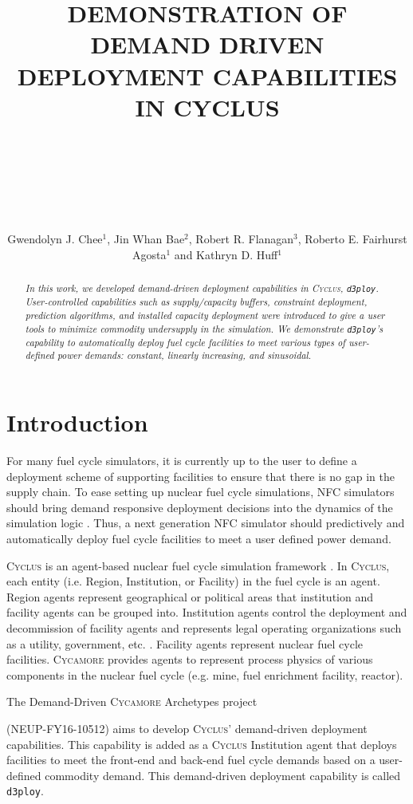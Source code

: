 \documentclass{anstrans}
\title{DEMONSTRATION OF DEMAND DRIVEN DEPLOYMENT CAPABILITIES IN CYCLUS \\~\\~\\~\\}
\author{Gwendolyn J. Chee$^1$, Jin Whan Bae$^2$, Robert R. Flanagan$^3$, Roberto E. Fairhurst Agosta$^1$ and Kathryn D. Huff$^1$}
\institute{
$^1$Dept. of Nuclear, Plasma and Radiological Engineering, University of Illinois at Urbana-Champaign \\
$^2$ Oak Ridge National Laboratory, Oak Ridge, TN, United States \\
$^3$Nuclear Engineering Program, University of South Carolina \\
}
\newcommand{\Cyclus}{\textsc{Cyclus}\xspace}%
\newcommand{\Cycamore}{\textsc{Cycamore}\xspace}%
\newcommand{\deploy}{\texttt{d3ploy}\xspace}%
\begin{document}
\begin{abstract}
%
\textit{
	In this work, we developed demand-driven deployment 
	capabilities in \Cyclus, \deploy. 
	User-controlled capabilities such 
	as supply/capacity buffers, constraint deployment, prediction 
	algorithms, and installed capacity deployment were 
	introduced to give a user tools to minimize commodity 
	undersupply in the simulation. 
	We demonstrate \deploy's capability 
	to automatically deploy fuel cycle facilities to meet various 
	types of user-defined power demands: constant, linearly increasing, 
	and sinusoidal.
}
\end{abstract}

\section{Introduction}
For many fuel cycle simulators, it is currently up to the user 
to define a deployment scheme of supporting facilities to ensure 
that there is no gap in the supply chain. 
To ease setting up nuclear fuel cycle simulations, \gls{NFC}
simulators should bring demand responsive deployment decisions into 
the dynamics of the simulation logic \cite{huff_current_2017}. 
Thus, a next generation \gls{NFC} simulator should predictively and 
automatically deploy fuel cycle facilities to meet a user defined 
power demand. 

\Cyclus is an agent-based nuclear fuel cycle simulation framework 
\cite{huff_fundamental_2016}. 
In \Cyclus, each entity (i.e. Region, Institution, or Facility) in the 
fuel cycle is an agent. 
Region agents represent geographical or political areas that institution
and facility agents can be grouped into. 
Institution agents control the 
deployment and decommission of facility agents 
and represents legal operating organizations such as a 
utility, government, etc. \cite{huff_fundamental_2016}. 
Facility agents represent nuclear fuel cycle facilities. 
\Cycamore \cite{carlsen_cycamore_2014}
provides agents to represent process physics of various 
components in the nuclear fuel cycle (e.g. mine, fuel enrichment 
facility, reactor). 

The Demand-Driven \Cycamore Archetypes project 

\noindent
(NEUP-FY16-10512) 
aims to develop \Cyclus' demand-driven deployment capabilities. 
This capability is added as a \Cyclus Institution
agent that deploys facilities to meet the front-end and back-end 
fuel cycle demands based on a user-defined commodity demand. 
This demand-driven deployment capability is called 
\deploy. 
\end{document}
